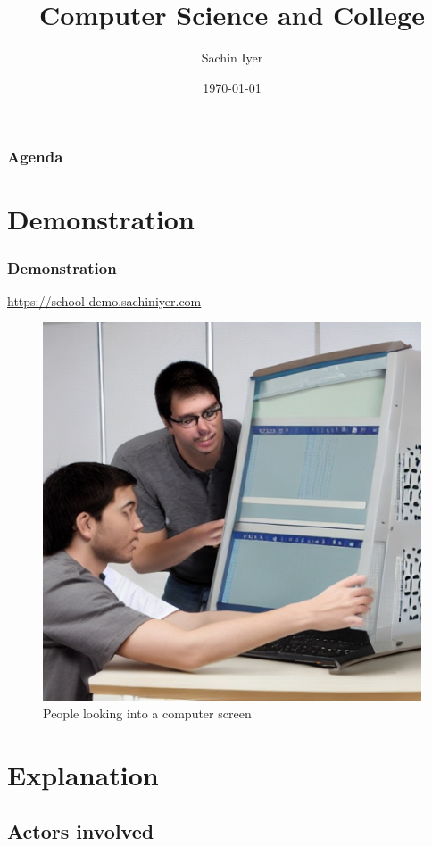 \documentclass[
	11pt,
	t,
]{beamer}
\title[Computer Science and College]{Computer Science and College}
\author[Sachin Iyer]{Sachin Iyer}
\institute[NYU]{New York University \\ \smallskip \textit{sachiniyer@nyu.edu}}
\date[\today]{\today}
\begin{document}
\begin{frame}
	\titlepage
\end{frame}

\begin{frame}
	\frametitle{Agenda}
	\tableofcontents[pausesections]
\end{frame}

\section{Demonstration}

\begin{frame}
	\frametitle{Demonstration}
	\href{https://school-demo.sachiniyer.com}{https://school-demo.sachiniyer.com}
	\bigskip
	\begin{figure}
	  \includegraphics[scale=0.17]{1.jpg}
	  \caption{People looking into a computer screen}
	\end{figure}
\end{frame}


\section{Explanation}
\subsection{Actors involved}
\end{document}
